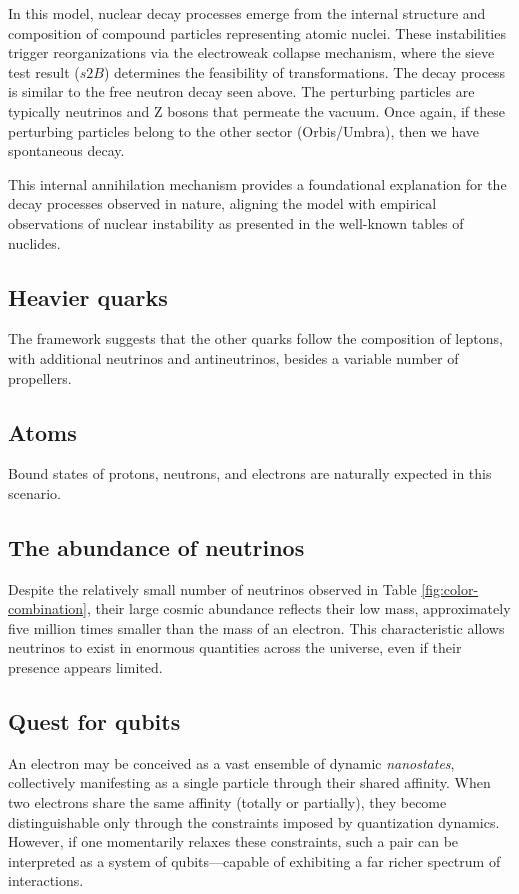 \documentclass{ijuc}
\begin{document}
In this model, nuclear decay processes emerge from the internal structure and composition of compound particles representing atomic nuclei. 
These instabilities trigger reorganizations via the electroweak collapse mechanism, where the sieve test result ($s2B$) determines the feasibility of transformations. 
The decay process is similar to the free neutron decay seen above. 
The perturbing particles are typically neutrinos and Z bosons that permeate the vacuum. Once again, if these perturbing particles belong to the other sector (Orbis/Umbra), then we have spontaneous decay.

This internal annihilation mechanism provides a foundational explanation for the decay processes observed in nature, aligning the model with empirical observations of nuclear instability as presented in the well-known tables of nuclides.

\subsection{Heavier quarks}
The framework suggests that the other quarks follow the composition of leptons, with additional neutrinos and antineutrinos, besides a variable number of propellers.

\subsection{Atoms}
Bound states of protons, neutrons, and electrons are naturally expected in this scenario.

\subsection{The abundance of neutrinos}

Despite the relatively small number of neutrinos observed in Table \ref{fig:color-combination}, their large cosmic abundance reflects their low mass, approximately five million times smaller than the mass of an electron. 
This characteristic allows neutrinos to exist in enormous quantities across the universe, even if their presence appears limited.

\subsection{Quest for qubits} \label{subsection:qubits}

An electron may be conceived as a vast ensemble of dynamic \textit{nanostates}, collectively manifesting as a single particle through their shared affinity. 
When two electrons share the same affinity (totally or partially), they become distinguishable only through the constraints imposed by quantization dynamics. 
However, if one momentarily relaxes these constraints, such a pair can be interpreted as a system of qubits—capable of exhibiting a far richer spectrum of interactions.
\end{document}
